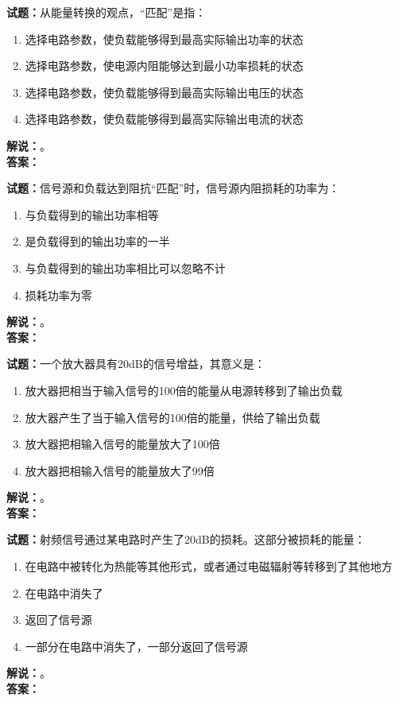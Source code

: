\documentclass{ctexbook}
\begin{document}
\bigskip

\noindent\textbf{试题：}从能量转换的观点，“匹配”是指：
\begin{enumerate}[leftmargin=3em]
  \item 选择电路参数，使负载能够得到最高实际输出功率的状态
  \item 选择电路参数，使电源内阻能够达到最小功率损耗的状态
  \item 选择电路参数，使负载能够得到最高实际输出电压的状态
  \item 选择电路参数，使负载能够得到最高实际输出电流的状态
\end{enumerate}
\noindent\textbf{解说：}\textbf{}。\\\noindent\textbf{答案：}

\bigskip

\noindent\textbf{试题：}信号源和负载达到阻抗“匹配”时，信号源内阻损耗的功率为：
\begin{enumerate}[leftmargin=3em]
  \item 与负载得到的输出功率相等
  \item 是负载得到的输出功率的一半
  \item 与负载得到的输出功率相比可以忽略不计
  \item 损耗功率为零
\end{enumerate}
\noindent\textbf{解说：}\textbf{}。\\\noindent\textbf{答案：}

\bigskip

\noindent\textbf{试题：}一个放大器具有20dB的信号增益，其意义是：
\begin{enumerate}[leftmargin=3em]
  \item 放大器把相当于输入信号的100倍的能量从电源转移到了输出负载
  \item 放大器产生了当于输入信号的100倍的能量，供给了输出负载
  \item 放大器把相输入信号的能量放大了100倍
  \item 放大器把相输入信号的能量放大了99倍
\end{enumerate}
\noindent\textbf{解说：}\textbf{}。\\\noindent\textbf{答案：}

\bigskip

\noindent\textbf{试题：}射频信号通过某电路时产生了20dB的损耗。这部分被损耗的能量：
\begin{enumerate}[leftmargin=3em]
  \item 在电路中被转化为热能等其他形式，或者通过电磁辐射等转移到了其他地方
  \item 在电路中消失了
  \item 返回了信号源
  \item 一部分在电路中消失了，一部分返回了信号源
\end{enumerate}
\noindent\textbf{解说：}\textbf{}。\\\noindent\textbf{答案：}
\end{document}

